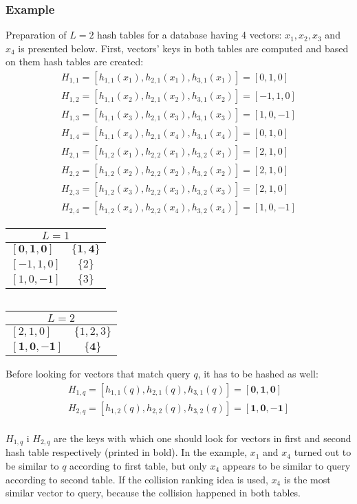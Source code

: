 \subsubsection*{Example}
Preparation of $L = 2$ hash tables for a database having 4 vectors:
$x_1, x_2, x_3$ and $x_4$ is presented below.
First, vectors' keys in both tables are computed and based on them hash tables are created:
\begin{gather*}
H_{1,1} = [h_{1,1}(x_1), h_{2,1}(x_1), h_{3,1}(x_1)] = [0, 1, 0]\\
H_{1,2} = [h_{1,1}(x_2), h_{2,1}(x_2), h_{3,1}(x_2)] = [-1, 1, 0]\\
H_{1,3} = [h_{1,1}(x_3), h_{2,1}(x_3), h_{3,1}(x_3)] = [1, 0, -1]\\
H_{1,4} = [h_{1,1}(x_4), h_{2,1}(x_4), h_{3,1}(x_4)] = [0, 1, 0]\\
H_{2,1} = [h_{1,2}(x_1), h_{2,2}(x_1), h_{3,2}(x_1)] = [2, 1, 0]\\
H_{2,2} = [h_{1,2}(x_2), h_{2,2}(x_2), h_{3,2}(x_2)] = [2, 1, 0]\\
H_{2,3} = [h_{1,2}(x_3), h_{2,2}(x_3), h_{3,2}(x_3)] = [2, 1, 0]\\
H_{2,4} = [h_{1,2}(x_4), h_{2,2}(x_4), h_{3,2}(x_4)] = [1, 0, -1]
\end{gather*}
\renewcommand{\arraystretch}{1.2}
\begin{center}
\begin{tabular}{|l|c|}
\hline
\multicolumn{2}{|c|}{$L = 1$} \\
\hline
$\bm{[0, 1, 0]}$ & $\bm{\{1, 4\}}$ \\
\hline
$[-1, 1, 0]$ & $\{2\}$ \\
\hline
$[1, 0, -1]$ & $\{3\}$ \\
\hline
\end{tabular}
$\ \ \ \ $
\begin{tabular}{|l|c|}
\hline
\multicolumn{2}{|c|}{$L = 2$} \\
\hline
$[2, 1, 0]$ & $\{1, 2, 3\}$ \\
\hline
$\bm{[1, 0, -1]}$ & $\bm{\{4\}}$ \\
\hline
\end{tabular}
\end{center}

Before looking for vectors that match query $q$, it has to be hashed as well:
\begin{gather*}
H_{1,q} = [h_{1,1}(q), h_{2,1}(q), h_{3,1}(q)] = \bm{[0, 1, 0]} \\
H_{2,q} = [h_{1,2}(q), h_{2,2}(q), h_{3,2}(q)] = \bm{[1, 0, -1]} \\
\end{gather*}

$H_{1,q}$ i $H_{2,q}$ are the keys with which one should look for vectors in first and second hash table respectively (printed in bold).
In the example, $x_1$ and $x_4$ turned out to be similar to $q$ according to first table, but only $x_4$ appears to be similar to query according to second table.
If the collision ranking idea is used, $x_4$ is the most similar vector to query, because the collision happened in both tables.
\newpage
